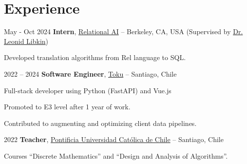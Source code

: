 \section{Experience}

\begin{twocolentry}{
    May - Oct 2024
}
    \textbf{Intern}, \href{https://www.relational.ai/}{Relational AI} -- Berkeley, CA, USA {\footnotesize (Supervised by \href{http://libk.in/}{Dr. Leonid Libkin})}
\end{twocolentry}
\vspace{0.10 cm}
\begin{onecolentry}
    \begin{highlights}
        \item Developed translation algorithms from Rel language to SQL.
    \end{highlights}
\end{onecolentry}
\vspace{0.2 cm}

\begin{twocolentry}{
    2022 – 2024
}
    \textbf{Software Engineer}, \href{https://www.trytoku.com/}{Toku} -- Santiago, Chile\end{twocolentry}

\vspace{0.10 cm}
\begin{onecolentry}
    \begin{highlights}
        \item Full-stack developer using Python (FastAPI) and Vue.js
        \item Promoted to E3 level after 1 year of work.
        \item Contributed to augmenting and optimizing client data pipelines.
    \end{highlights}
\end{onecolentry}

\vspace{0.2 cm}

\begin{twocolentry}{
    2022
}
    \textbf{Teacher}, \href{https://www.uc.cl/}{Pontificia Universidad Católica de Chile} -- Santiago, Chile\end{twocolentry}

\vspace{0.10 cm}
\begin{onecolentry}
    \begin{highlights}
        \item Courses ``Discrete Mathematics'' and ``Design and Analysis of Algorithms''.
    \end{highlights}
\end{onecolentry}

